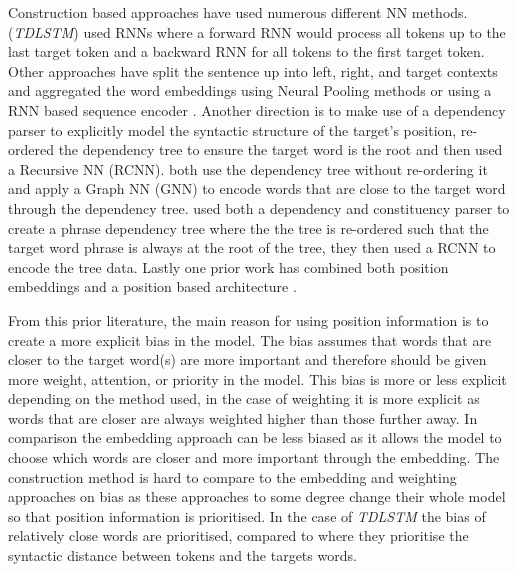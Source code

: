 Construction based approaches have used numerous different NN methods. \citet{tang-etal-2016-effective} (\textit{TDLSTM}) used RNNs where a forward RNN would process all tokens up to the last target token and a backward RNN for all tokens to the first target token. Other approaches have split the sentence up into left, right, and target contexts and aggregated the word embeddings using Neural Pooling methods \citep{vo2015target, zhang2016gated} or using a RNN based sequence encoder \citep{liu-zhang-2017-attention}. Another direction is to make use of a dependency parser to explicitly model the syntactic structure of the target's position, \citet{dong-etal-2014-adaptive} re-ordered the dependency tree to ensure the target word is the root and then used a Recursive NN (RCNN). \citet{sun-etal-2019-aspect, huang-carley-2019-syntax} both use the dependency tree without re-ordering it and apply a Graph NN (GNN) to encode words that are close to the target word through the dependency tree. \citet{nguyen-shirai-2015-phrasernn} used both a dependency and constituency parser to create a phrase dependency tree where the the tree is re-ordered such that the target word phrase is always at the root of the tree, they then used a RCNN to encode the tree data. Lastly one prior work has combined both position embeddings and a position based architecture \citep{sun-etal-2019-aspect}.

From this prior literature, the main reason for using position information is to create a more explicit bias in the model. The bias assumes that words that are closer to the target word(s) are more important and therefore should be given more weight, attention, or priority in the model. This bias is more or less explicit depending on the method used, in the case of weighting it is more explicit as words that are closer are always weighted higher than those further away. In comparison the embedding approach can be less biased as it allows the model to choose which words are closer and more important through the embedding. The construction method is hard to compare to the embedding and weighting approaches on bias as these approaches to some degree change their whole model so that position information is prioritised. In the case of \textit{TDLSTM} \citep{tang-etal-2016-effective} the bias of relatively close words are prioritised, compared to \citet{dong-etal-2014-adaptive} where they prioritise the syntactic distance between tokens and the targets words. 

